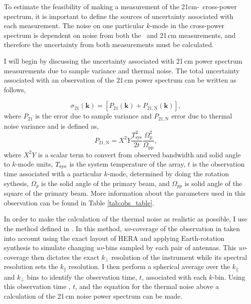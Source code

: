 To estimate the feasibility of making a measurement of the 21cm-\lya\ cross-power
spectrum, it is important to define the sources of uncertainty associated with each
measurement. The noise on one particular $k$-mode in the cross-power spectrum is
dependent on noise from both the \lya\ and 21\,cm measurements, and therefore the
uncertainty from both measurements must be calculated.

I will begin by discussing the uncertainty associated with 21\,cm power
spectrum measurements due to sample variance and thermal noise. The total uncertainty
associated with an observation of the 21\,cm power spectrum can be written as follows,

\begin{equation}
\sigma_{21} \left( \textbf{k} \right) = \left[ P_{21} \left( \textbf{k} \right) + P_{21, \textrm{N}} \left( \textbf{k} \right) \right],
\end{equation}
where $P_{21}$ is the error due to sample variance and $P_{21, \textrm{N}}$ error due to thermal noise variance and is defined as,
\begin{equation}
P_{21, \textrm{N}} = X^2 Y \frac{T^2_{\textrm{sys}}}{2 t} \frac{\Omega_{\textrm{p}}^2}{\Omega_{\textrm{pp}}},
\end{equation}
where $X^2Y$ is a scalar term to convert from observed bandwidth and solid angle to $k$-mode units, $T_{\rm sys}$ is the system temperature of the array, $t$ is the observation time associated with a particular $k$-mode, determined by doing the rotation sythesis, $\Omega_p$ is the solid angle of the primary beam, and $\Omega_{pp}$ is solid angle of the square of the primary beam. More information about the parameters used in this observation can be found in Table \ref{tab:obs_table}.

In order to make the calculation of the thermal noise as realistic as possible, I use the method defined in
\cite{2013AJ....145...65P}. In this method, \textit{uv}-coverage of the observation
in taken into account using the exact layout of HERA and applying Earth-rotation
synthesis to simulate changing \textit{uv}-bins sampled by each pair of antennas.
This \textit{uv}-coverage then dictates the exact $k_{\perp}$ resolution of the instrument
while its spectral resolution sets the $k_{\parallel}$ resolution. I then perform
a spherical average over the $k_{\parallel}$ and $k_{\perp}$ bins to identify
the observation time, $t$, associated with each $k$-bin. Using this observation time
, $t$, and the equation for the thermal noise above a calculation of the 21\,cm noise power
spectrum can be made.

